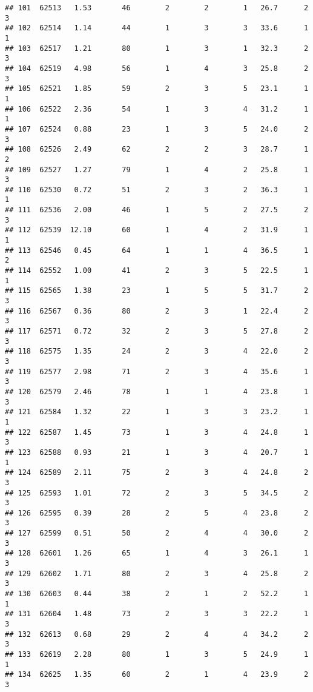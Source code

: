 \documentclass[
]{article}
\begin{document}
\begin{verbatim}
## 101  62513   1.53       46        2        2        1   26.7      2      3
## 102  62514   1.14       44        1        3        3   33.6      1      1
## 103  62517   1.21       80        1        3        1   32.3      2      3
## 104  62519   4.98       56        1        4        3   25.8      2      3
## 105  62521   1.85       59        2        3        5   23.1      1      1
## 106  62522   2.36       54        1        3        4   31.2      1      1
## 107  62524   0.88       23        1        3        5   24.0      2      3
## 108  62526   2.49       62        2        2        3   28.7      1      2
## 109  62527   1.27       79        1        4        2   25.8      1      3
## 110  62530   0.72       51        2        3        2   36.3      1      1
## 111  62536   2.00       46        1        5        2   27.5      2      3
## 112  62539  12.10       60        1        4        2   31.9      1      1
## 113  62546   0.45       64        1        1        4   36.5      1      2
## 114  62552   1.00       41        2        3        5   22.5      1      1
## 115  62565   1.38       23        1        5        5   31.7      2      3
## 116  62567   0.36       80        2        3        1   22.4      2      3
## 117  62571   0.72       32        2        3        5   27.8      2      3
## 118  62575   1.35       24        2        3        4   22.0      2      3
## 119  62577   2.98       71        2        3        4   35.6      1      3
## 120  62579   2.46       78        1        1        4   23.8      1      3
## 121  62584   1.32       22        1        3        3   23.2      1      1
## 122  62587   1.45       73        1        3        4   24.8      1      3
## 123  62588   0.93       21        1        3        4   20.7      1      1
## 124  62589   2.11       75        2        3        4   24.8      2      3
## 125  62593   1.01       72        2        3        5   34.5      2      3
## 126  62595   0.39       28        2        5        4   23.8      2      3
## 127  62599   0.51       50        2        4        4   30.0      2      3
## 128  62601   1.26       65        1        4        3   26.1      1      3
## 129  62602   1.71       80        2        3        4   25.8      2      3
## 130  62603   0.44       38        2        1        2   52.2      1      1
## 131  62604   1.48       73        2        3        3   22.2      1      3
## 132  62613   0.68       29        2        4        4   34.2      2      3
## 133  62619   2.28       80        1        3        5   24.9      1      1
## 134  62625   1.35       60        2        1        4   23.9      2      3

\end{verbatim}
\end{document}
